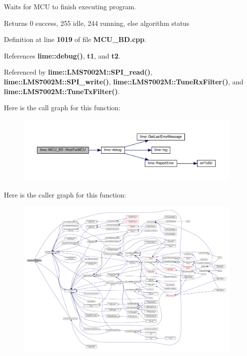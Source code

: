 Waits for M\+CU to finish executing program. 

\begin{DoxyReturn}{Returns}
0 success, 255 idle, 244 running, else algorithm status 
\end{DoxyReturn}


Definition at line {\bf 1019} of file {\bf M\+C\+U\+\_\+\+B\+D.\+cpp}.



References {\bf lime\+::debug()}, {\bf t1}, and {\bf t2}.



Referenced by {\bf lime\+::\+L\+M\+S7002\+M\+::\+S\+P\+I\+\_\+read()}, {\bf lime\+::\+L\+M\+S7002\+M\+::\+S\+P\+I\+\_\+write()}, {\bf lime\+::\+L\+M\+S7002\+M\+::\+Tune\+Rx\+Filter()}, and {\bf lime\+::\+L\+M\+S7002\+M\+::\+Tune\+Tx\+Filter()}.



Here is the call graph for this function\+:
\nopagebreak
\begin{figure}[H]
\begin{center}
\leavevmode
\includegraphics[width=350pt]{d8/d9c/classlime_1_1MCU__BD_a493b37b20fd7cc215a8dbcda5e0a49dc_cgraph}
\end{center}
\end{figure}




Here is the caller graph for this function\+:
\nopagebreak
\begin{figure}[H]
\begin{center}
\leavevmode
\includegraphics[width=350pt]{d8/d9c/classlime_1_1MCU__BD_a493b37b20fd7cc215a8dbcda5e0a49dc_icgraph}
\end{center}
\end{figure}


